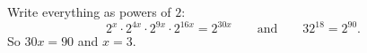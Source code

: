Write everything as powers of $2$:
\[
2^x\cdot2^{4x}\cdot2^{9x}\cdot2^{16x}=2^{30x}\qquad\text{and}\qquad32^{18}=2^{90}.
\]
So $30x=90$ and $x=\boxed{3}$.
